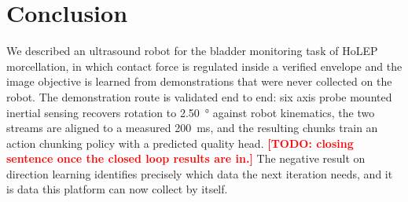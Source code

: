 \documentclass[conference]{IEEEtran}
\newcommand{\TODO}[1]{\textcolor{red}{\textbf{[TODO: #1]}}}
\begin{document}
\section{Conclusion}

We described an ultrasound robot for the bladder monitoring task of HoLEP
morcellation, in which contact force is regulated inside a verified envelope and
the image objective is learned from demonstrations that were never collected on
the robot. The demonstration route is validated end to end: six axis probe
mounted inertial sensing recovers rotation to \SI{2.50}{\degree} against robot
kinematics, the two streams are aligned to a measured \SI{200}{\milli\second},
and the resulting chunks train an action chunking policy with a predicted
quality head. \TODO{closing sentence once the closed loop results are in.} The
negative result on direction learning identifies precisely which data the next
iteration needs, and it is data this platform can now collect by itself.




\balance
\end{document}
